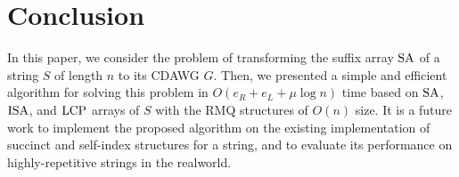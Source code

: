 \documentclass{article}
\begin{document}
\section{Conclusion}
\label{sec:concl}
In this paper, we consider the problem of transforming the suffix array $\mathrm{SA}$ of a string $S$ of length $n$ to its CDAWG $G$. Then, we  presented a simple and efficient algorithm for solving this problem in $O(e_R + e_L + \mu\log n)$ time  based on $\mathrm{SA}$, $\mathrm{ISA}$, and $\mathrm{LCP}$ arrays of $S$ with the RMQ structures of $O(n)$ size.
It is a future work to implement the proposed algorithm on the existing implementation of succinct and self-index structures for a string, and to evaluate its performance on highly-repetitive strings in the realworld. 



\newpage


\end{document}
